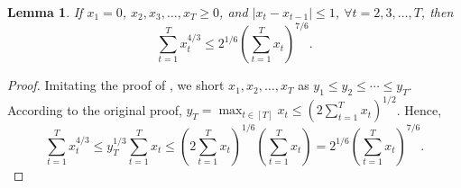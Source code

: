 \documentclass[11pt,fullpage,letterpaper]{article} %
\newtheorem{lemma}[theorem]{Lemma}
\begin{document}
\begin{lemma}\label{lem:4/3 upper bound}
If $x_1=0$, $x_2,x_3,\ldots,x_T\ge 0$, and $\lvert x_t-x_{t-1}\rvert\le 1$, $\forall t=2,3,\ldots,T$, then
\begin{equation*}
\sum_{t=1}^T x_t^{4/3} \le 2^{1/6} \left (\sum_{t=1}^T x_t\right )^{7/6}.
\end{equation*}
\end{lemma}
\begin{proof}
Imitating the proof of  \citep[Lemma 4]{huang2023queue}, we short $x_1,x_2,\ldots,x_T$ as $y_1\le y_2\le \cdots \le y_T$. According to the original proof, $y_T=\max_{t\in [T]} x_t\le (2 \sum_{t=1}^T x_t)^{1/2}$. Hence,
\begin{equation*}
\sum_{t=1}^T x_t^{4/3} \le y_T^{1/3} \sum_{t=1}^T x_t \le \left (2 \sum_{t=1}^T x_t\right )^{1/6} \left (\sum_{t=1}^T x_t\right ) = 2^{1/6} \left (\sum_{t=1}^T x_t\right )^{7/6}.
\end{equation*}
\end{proof}
\end{document}

